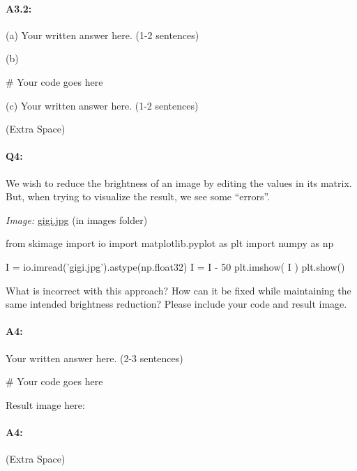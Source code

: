 \documentclass[11pt]{article}
\begin{document}
\paragraph{A3.2:} 

(a) Your written answer here. (1-2 sentences)

(b) 
\begin{python}
# Your code goes here
\end{python}

(c) Your written answer here. (1-2 sentences)

 (Extra Space)



\pagebreak
\paragraph{Q4:} We wish to reduce the brightness of an image by editing the values in its matrix. But, when trying to visualize the result, we see some ``errors''.

\emph{Image:} \href{images/gigi.jpg}{gigi.jpg} (in images folder)

\begin{python}
from skimage import io
import matplotlib.pyplot as plt
import numpy as np

I =  io.imread('gigi.jpg').astype(np.float32)
I = I - 50
plt.imshow( I )
plt.show()
\end{python}

What is incorrect with this approach? How can it be fixed while maintaining the same intended brightness reduction? Please include your code and result image.

\paragraph{A4:} Your written answer here. (2-3 sentences)
\begin{python}
# Your code goes here
\end{python}

Result image here:

\pagebreak
\paragraph{A4:} (Extra Space)
\end{document}
